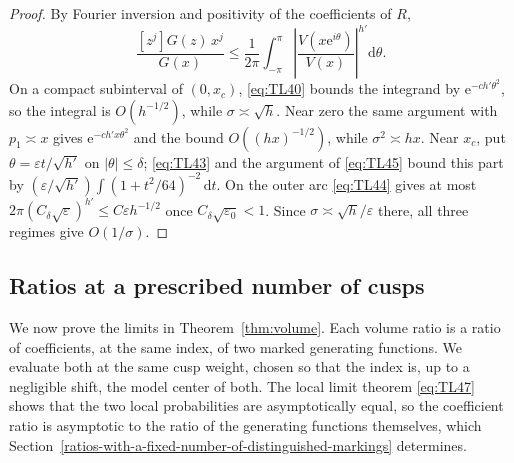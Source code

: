\begin{proof}
By Fourier inversion and positivity of the coefficients of $R$,
\[
 \frac{[z^j]G(z)\,x^j}{G(x)}
 \le\frac1{2\pi}\int_{-\pi}^{\pi}
       \left|\frac{V(x\mathrm e^{i\theta})}{V(x)}\right|^{h'}\mathrm d\theta.
\]
On a compact subinterval of $(0,x_c)$, \eqref{eq:TL40} bounds the
integrand by $\mathrm e^{-ch'\theta^2}$, so the integral is
$O(h^{-1/2})$, while $\sigma\asymp\sqrt h$. Near zero the same argument
with $p_1\asymp x$ gives $\mathrm e^{-ch'x\theta^2}$ and the bound
$O((hx)^{-1/2})$, while $\sigma^2\asymp hx$. Near $x_c$, put
$\theta=\varepsilon t/\sqrt{h'}$ on $|\theta|\le\delta$; \eqref{eq:TL43}
and the argument of \eqref{eq:TL45} bound this part by
$(\varepsilon/\sqrt{h'})\int(1+t^2/64)^{-2}\,\mathrm dt$. On the outer arc
\eqref{eq:TL44} gives at most
$2\pi(C_\delta\sqrt\varepsilon)^{h'}\le C\varepsilon h^{-1/2}$ once
$C_\delta\sqrt{\varepsilon_0}<1$. Since $\sigma\asymp\sqrt h/\varepsilon$
there, all three regimes give $O(1/\sigma)$.
\end{proof}

\subsection{Ratios at a prescribed number of cusps}\label{canonical-coefficient-ratios-and-all-cusp-count-uniformity}

We now prove the limits in Theorem~\ref{thm:volume}. Each volume ratio is
a ratio of coefficients, at the same index, of two marked generating
functions. We evaluate both at the same cusp weight, chosen so that the
index is, up to a negligible shift, the model center of both. The local limit theorem \eqref{eq:TL47} shows
that the two local probabilities are asymptotically equal, so the
coefficient ratio is asymptotic to the ratio of the generating functions
themselves, which Section~\ref{ratios-with-a-fixed-number-of-distinguished-markings}
determines.

